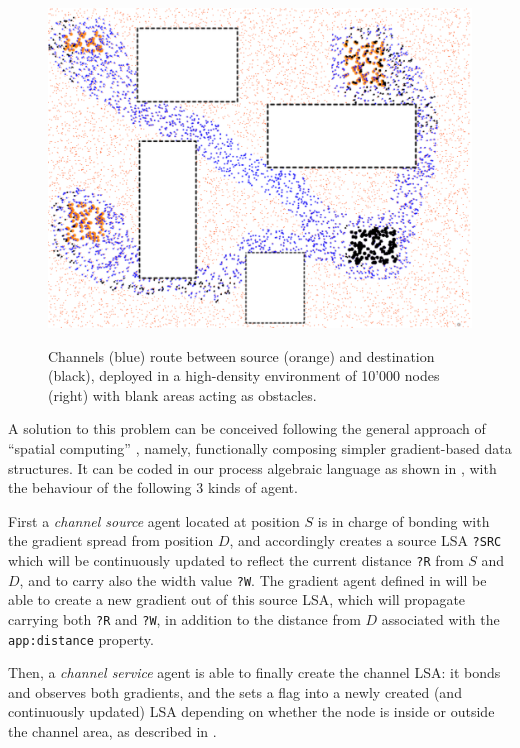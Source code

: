 \documentclass[12pt,a4paper,twoside,openright]{book}
\begin{document}
\begin{figure}
\begin{center}{\includegraphics[width=\textwidth]{img/continuous_black}}\end{center}
\caption[Channels routes in a dense distributed environment]{Channels (blue) route between source (orange) and destination (black), deployed in a high-density environment of 10'000 nodes (right) with blank areas acting as obstacles.}
\label{f:channel}
\end{figure}

A solution to this problem can be conceived following the general approach of ``spatial computing'' \cite{SpatialIGI2013,V-SCW2013,proto}, namely, functionally composing simpler gradient-based data structures.
%
It can be coded in our process algebraic language as shown in , with the behaviour of the following $3$ kinds of agent.

First a \emph{channel source} agent located at position $S$ is in charge of bonding with the gradient spread from position $D$, and accordingly creates a source LSA \texttt{?SRC} which will be continuously updated to reflect the current distance \texttt{?R} from $S$ and $D$, and to carry also the width value \texttt{?W}.
%
The gradient agent defined in  will be able to create a new gradient out of this source LSA, which will propagate carrying both \texttt{?R} and \texttt{?W}, in addition to the distance from $D$ associated with the  \texttt{app:distance} property.

Then, a \emph{channel service} agent is able to finally create the channel LSA: it bonds and observes both gradients, and the sets a flag into a newly created (and continuously updated) LSA depending on whether the node is inside or outside the channel area, as described in .
\end{document}
